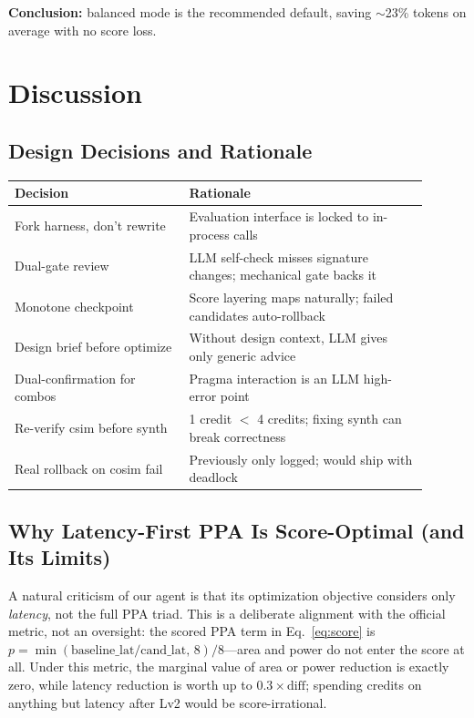 \documentclass[10pt,conference,letterpaper]{IEEEtran}
\begin{document}
\textbf{Conclusion:} balanced mode is the recommended default, saving $\sim$23\% tokens on average with no score loss.

\section{Discussion}
\label{app:discussion}

\subsection{Design Decisions and Rationale}

\begin{table}[h]
\centering
\small
\begin{tabular}{p{0.38\linewidth} p{0.52\linewidth}}
\toprule
\textbf{Decision} & \textbf{Rationale} \\
\midrule
Fork harness, don't rewrite & Evaluation interface is locked to in-process calls \\
Dual-gate review & LLM self-check misses signature changes; mechanical gate backs it \\
Monotone checkpoint & Score layering maps naturally; failed candidates auto-rollback \\
Design brief before optimize & Without design context, LLM gives only generic advice \\
Dual-confirmation for combos & Pragma interaction is an LLM high-error point \\
Re-verify csim before synth & 1 credit $<$ 4 credits; fixing synth can break correctness \\
Real rollback on cosim fail & Previously only logged; would ship with deadlock \\
\bottomrule
\end{tabular}
\end{table}

\subsection{Why Latency-First PPA Is Score-Optimal (and Its Limits)}
\label{sec:ppa-discussion}

A natural criticism of our agent is that its optimization objective considers only \emph{latency}, not the full PPA triad. This is a deliberate alignment with the official metric, not an oversight: the scored PPA term in Eq.~\eqref{eq:score} is $p=\min(\text{baseline\_lat}/\text{cand\_lat},\,8)/8$---area and power do not enter the score at all. Under this metric, the marginal value of area or power reduction is exactly zero, while latency reduction is worth up to $0.3\times\text{diff}$; spending credits on anything but latency after Lv2 would be score-irrational.
\end{document}

